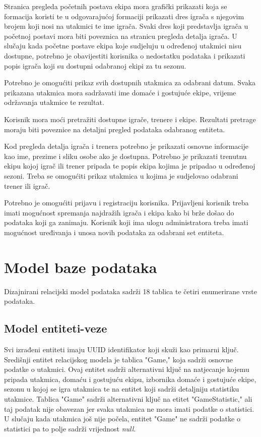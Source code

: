 \documentclass[times, utf8, zavrsni]{fer}
\begin{document}
Stranica pregleda početnih postava ekipa mora grafički prikazati koja se formacija koristi te u odgovarajućoj formaciji prikazati dres igrača s njegovim brojem koji nosi na utakmici te ime igrača.
Svaki dres koji predstavlja igrača u početnoj postavi mora biti poveznica na stranicu pregleda detalja igrača.
U slučaju kada početne postave ekipa koje sudjeluju u određenoj utakmici nisu dostupne, potrebno je obavijestiti korisnika o nedostatku podataka i prikazati popis igrača koji su dostupni odabranoj ekipi za tu sezonu.

Potrebno je omogućiti prikaz svih dostupnih utakmica za odabrani datum. Svaka prikazana utakmica mora sadržavati ime domaće i gostujuće ekipe, vrijeme održavanja utakmice te rezultat.

Korisnik mora moći pretražiti dostupne igrače, trenere i ekipe. Rezultati pretrage moraju biti poveznice na detaljni pregled podataka odabranog entiteta.

Kod pregleda detalja igrača i trenera potrebno je prikazati osnovne informacije kao ime, prezime i sliku osobe ako je dostupna.
Potrebno je prikazati trenutnu ekipu kojoj igrač ili trener pripada te popis ekipa kojima je pripadao u određenoj sezoni.
Treba se omogućiti prikaz utakmica u kojima je sudjelovao odabrani trener ili igrač.

Potrebno je omogućiti prijavu i registraciju korisnika. Prijavljeni korisnik treba imati mogućnost spremanja najdražih igrača i ekipa kako bi brže došao do podataka koji ga zanimaju.
Korisnik koji ima ulogu administratora treba imati mogućnost uređivanja i unosa novih podataka za odabrani set entiteta.

\chapter{Model baze podataka}

Dizajnirani relacijski model podataka sadrži 18 tablica te četiri enumerirane vrste podataka.

\section{Model entiteti-veze}

Svi izrađeni entiteti imaju UUID identifikator koji skuži kao primarni ključ.
Središnji entitet relacijskog modela je tablica "Game," koja sadrži osnovne podatke o utakmici.
Ovaj entitet sadrži alternativni ključ na natjecanje kojemu pripada utakmica, domaću i gostujuću ekipu, izbornika domaće i gostujuće ekipe,
sezonu u kojoj se igra utakmica te na entitet koji sadrži detaljniju statistiku utakmice.
Tablica "Game" sadrži alternativni ključ na etitet "GameStatistic," ali taj podatak nije obavezan jer svaka utakmica ne mora imati podatke o statistici.
U slučaju kada utakmica još nije počela, entitet "Game" ne sadrži podatke o statistici pa to polje sadrži vrijednost \emph{null}.
\end{document}
